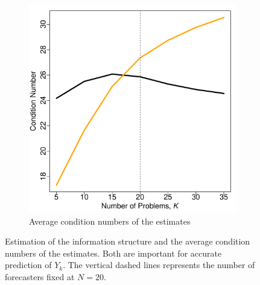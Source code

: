 \documentclass[11pt]{article}
\theoremstyle{definition}
\theoremstyle{definition}
\begin{document}
\begin{figure}[t!]
\begin{subfigure}{0.5\textwidth}
                \includegraphics[width=\textwidth]{simResCond.pdf}
                \caption{Average condition numbers of the estimates}
                                \label{SigmaInv}
        \end{subfigure}
        \caption{Estimation of the information structure and the average  condition numbers of the estimates. Both are important for accurate prediction of $Y_k$. The vertical dashed lines represents the number of forecasters fixed at $N = 20$.}
        \label{SigmaEstimation}
\end{figure}
\end{document}
